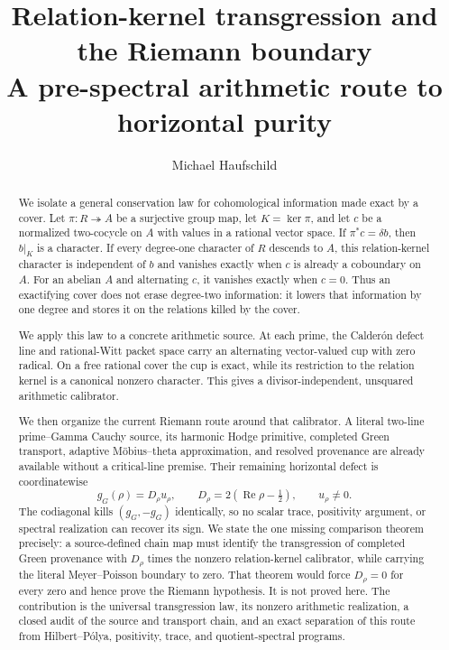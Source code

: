 \documentclass[11pt]{article}
\title{\textbf{Relation-kernel transgression and the Riemann boundary}\\
\large A pre-spectral arithmetic route to horizontal purity}
\author{Michael Haufschild}
\date{}
\theoremstyle{definition}
\theoremstyle{remark}
\numberwithin{equation}{section}
\newcommand{\Rea}{\operatorname{Re}}
\begin{document}
\maketitle

\begin{abstract}
We isolate a general conservation law for cohomological information made
exact by a cover.  Let $\pi:R\twoheadrightarrow A$ be a surjective group
map, let $K=\ker\pi$, and let $c$ be a normalized two-cocycle on $A$ with
values in a rational vector space.  If $\pi^*c=\delta b$, then $b|_K$ is a
character.  If every degree-one character of $R$ descends to $A$, this
relation-kernel character is independent of $b$ and vanishes exactly when
$c$ is already a coboundary on $A$.  For an abelian $A$ and alternating
$c$, it vanishes exactly when $c=0$.  Thus an exactifying cover does not
erase degree-two information: it lowers that information by one degree and
stores it on the relations killed by the cover.

We apply this law to a concrete arithmetic source.  At each prime, the
Calder\'on defect line and rational-Witt packet space carry an alternating
vector-valued cup with zero radical.  On a free rational cover the cup is
exact, while its restriction to the relation kernel is a canonical nonzero
character.  This gives a divisor-independent, unsquared arithmetic
calibrator.

We then organize the current Riemann route around that calibrator.  A literal
two-line prime--Gamma Cauchy source, its harmonic Hodge primitive, completed
Green transport, adaptive M\"obius--theta approximation, and resolved
provenance are already available without a critical-line premise.  Their
remaining horizontal defect is coordinatewise
\[
             g_G(\rho)=D_\rho u_\rho,
        \qquad D_\rho=2(\Rea\rho-\tfrac12),\qquad u_\rho\ne0.
\]
The codiagonal kills $(g_G,-g_G)$ identically, so no scalar trace,
positivity argument, or spectral realization can recover its sign.  We
state the one missing comparison theorem precisely: a source-defined chain
map must identify the transgression of completed Green provenance with
$D_\rho$ times the nonzero relation-kernel calibrator, while carrying the
literal Meyer--Poisson boundary to zero.  That theorem would force
$D_\rho=0$ for every zero and hence prove the Riemann hypothesis.  It is not
proved here.  The contribution is the universal transgression law, its
nonzero arithmetic realization, a closed audit of the source and transport
chain, and an exact separation of this route from Hilbert--P\'olya,
positivity, trace, and quotient-spectral programs.
\end{abstract}
\end{document}
